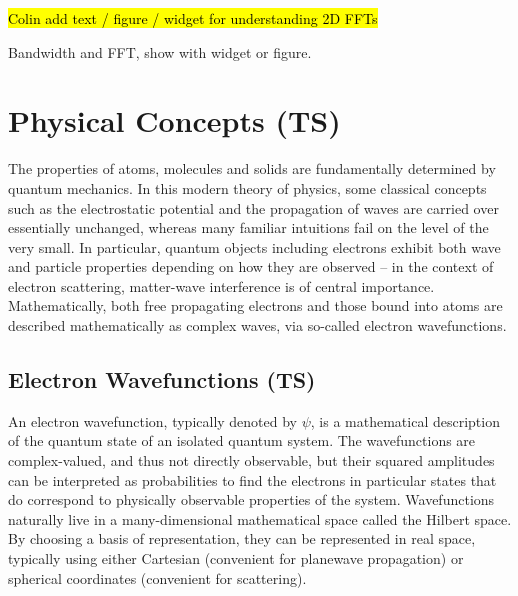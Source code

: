 \documentclass[%
 superscriptaddress,
 aip,
 amsmath,amssymb,
preprint,%
 author-year,%
longbibliography
]{revtex4-2}
\begin{document}
\hl{Colin add text / figure / widget for understanding 2D FFTs}

Bandwidth and FFT, show with widget or figure.
\break

\section*{Physical Concepts (TS)}\label{physics_stuff}

The properties of atoms, molecules and solids are fundamentally determined by quantum mechanics. In this modern theory of physics, some classical concepts such as the electrostatic potential and the propagation of waves are carried over essentially unchanged, whereas many familiar intuitions fail on the level of the very small. In particular, quantum objects including electrons exhibit both wave and particle properties depending on how they are observed -- in the context of electron scattering, matter-wave interference is of central importance. Mathematically, both free propagating electrons and those bound into atoms are described mathematically as complex waves, via so-called electron wavefunctions.

\subsection*{Electron Wavefunctions (TS)}

An electron wavefunction, typically denoted by $\psi$, is a mathematical description of the quantum state of an isolated quantum system. The wavefunctions are complex-valued, and thus not directly observable, but their squared amplitudes can be interpreted as probabilities to find the electrons in particular states that do correspond to physically observable properties of the system. Wavefunctions naturally live in a many-dimensional mathematical space called the Hilbert space. By choosing a basis of representation, they can be represented in real space, typically using either Cartesian (convenient for planewave propagation) or spherical coordinates (convenient for scattering).
\end{document}
